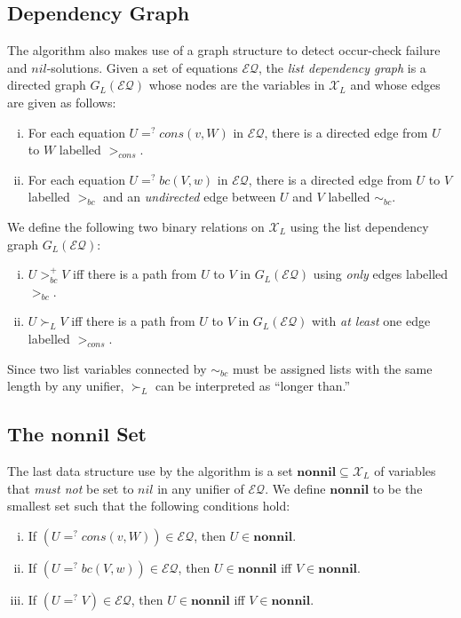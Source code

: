 \documentclass[11pt,twoside,titlepage]{article}
\newcommand{\ueq}{=_{}^?}
\newcommand{\X}{\mathcal{X}}
\newcommand{\EQ}{\mathcal{EQ}}
\newcommand{\Bc}{\mathit{bc}}
\newcommand{\Cons}{\mathit{cons}}
\newcommand{\Nil}{\mathit{nil}}
\newcommand{\Nonnil}{\mathbf{nonnil}}
\begin{document}
\subsection{Dependency Graph}\label{subsection:graph}

The algorithm also makes use of a graph structure to detect occur-check failure
and $\Nil$-solutions. Given a set of equations $\EQ$, the \emph{list dependency
graph} is a directed graph $G_L(\EQ)$ whose nodes are the variables in $\X_L$ and
whose edges are given as follows:
\begin{enumerate}[(i)]
    \item For each equation $U \ueq \Cons(v, W)$ in $\EQ$, there is a directed
        edge from $U$ to $W$ labelled $>_{\Cons}$.
    \item For each equation $U \ueq \Bc(V, w)$ in $\EQ$, there is a directed
        edge from $U$ to $V$ labelled $>_{\Bc}$ and an \emph{undirected} edge
        between $U$ and $V$ labelled $\sim_{\Bc}$.
\end{enumerate}
We define the following two binary relations on $\X_L$ using the list dependency
graph $G_L(\EQ)$:
\begin{enumerate}[(i)]
    \item $U >_{\Bc}^+ V$ iff there is a path from $U$ to $V$ in $G_L(\EQ)$
        using \emph{only} edges labelled $>_{\Bc}$.

    \item $U \succ_L V$ iff there is a path from $U$ to $V$ in $G_L(\EQ)$ with
        \emph{at least} one edge labelled $>_{\Cons}$.
\end{enumerate}
Since two list variables connected by $\sim_{\Bc}$ must be assigned lists with
the same length by any unifier, $\succ_L$ can be interpreted as ``longer than.''

\subsection{The \texorpdfstring{$\Nonnil$}{nonnil} Set}
\label{subsection:nonnil}

The last data structure use by the algorithm is a set $\Nonnil \subseteq \X_L$
of variables that \emph{must not} be set to $\Nil$ in any unifier of $\EQ$. We
define $\Nonnil$ to be the smallest set such that the following conditions hold:
\begin{enumerate}[(i)]
    \item If $(U \ueq \Cons(v, W)) \in \EQ$, then $U \in \Nonnil$.
    \item If $(U \ueq \Bc(V, w)) \in \EQ$, then $U \in \Nonnil$ iff $V \in \Nonnil$.
    \item If $(U \ueq V) \in \EQ$, then $U \in \Nonnil$ iff $V \in \Nonnil$.
\end{enumerate}
\end{document}

